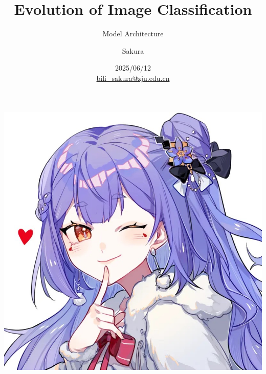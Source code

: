 \documentclass[aspectratio=169]{beamer}
\title[]{Evolution of Image Classification}
\subtitle{Model Architecture}
\author[author]{Sakura}
\date{2025/06/12\\\small\href{mailto:bili_sakura@zju.edu.cn}{bili\_sakura@zju.edu.cn}}
\begin{document}
\begin{frame}
  \begin{minipage}{0.68\linewidth}
    \titlepage
  \end{minipage}%
  \hfill
  \begin{minipage}{0.30\linewidth}
    \centering
    \includegraphics[width=0.9\linewidth]{profile_new.jpeg}
  \end{minipage}
\end{frame}


\end{document}
